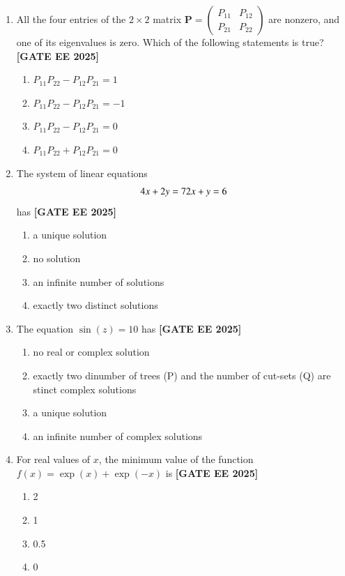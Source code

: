 \documentclass[12pt,a4paper]{article}
\begin{document}
\begin{enumerate}[leftmargin=2.5em, label=\textbf{Q.\arabic*}., itemsep=2em]
\item All the four entries of the $2\times2$ matrix $\mathbf{P} = \begin{pmatrix} P_{11} & P_{12}\\ P_{21} & P_{22} \end{pmatrix}$ are nonzero, and one of its eigenvalues is zero. Which of the following statements is true?
\newline
\noindent \textbf{[GATE EE 2025]}
    \begin{enumerate}[label=(\Alph*)]
        \item $P_{11}P_{22} - P_{12}P_{21} = 1$
        \item $P_{11}P_{22} - P_{12}P_{21} = -1$
        \item $P_{11}P_{22} - P_{12}P_{21} = 0$
        \item $P_{11}P_{22} + P_{12}P_{21} = 0$
    \end{enumerate}

\item The system of linear equations
\[
4x + 2y = 7 \\
2x + y = 6
\]
has
\newline
\noindent \textbf{[GATE EE 2025]}
    \begin{enumerate}[label=(\Alph*)]
        \item a unique solution
        \item no solution
        \item an infinite number of solutions
        \item exactly two distinct solutions
    \end{enumerate}

\item The equation $\sin(z) = 10$ has
\newline
\noindent \textbf{[GATE EE 2025]}
    \begin{enumerate}[label=(\Alph*)]
        \item no real or complex solution
        \item exactly two dinumber of trees (P) and the number of cut-sets (Q) are
stinct complex solutions
        \item a unique solution
        \item an infinite number of complex solutions
    \end{enumerate}

\item For real values of $x$, the minimum value of the function $f(x) = \exp(x) + \exp(-x)$ is
\newline
\noindent \textbf{[GATE EE 2025]}
    \begin{enumerate}[label=(\Alph*)]
        \item 2
        \item 1
        \item 0.5
        \item 0
    \end{enumerate}


\end{enumerate}
\end{document}
